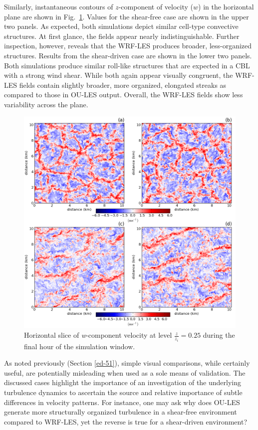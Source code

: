 Similarly, instantaneous contours of $z$-component of velocity ($w$) in the horizontal plane are shown in Fig.~\ref{figure503}. Values for the shear-free case are shown in the upper two panels. As expected, both simulations depict similar cell-type convective structures. At first glance, the fields appear nearly indistinguishable. Further inspection, however, reveals that the WRF-LES produces broader, less-organized structures. Results from the shear-driven case are shown in the lower two panels. Both simulations produce similar roll-like structures that are expected in a CBL with a strong wind shear. While both again appear visually congruent, the WRF-LES fields contain slightly broader, more organized, elongated streaks as compared to those in OU-LES output. Overall, the WRF-LES fields show less variability across the plane.


\begin{figure}[!ht]
\begin{center}
\includegraphics[width=\textwidth]{figures/chapter5/w_slice}
\end{center}
\caption{Horizontal slice of \textit{w}-component velocity at level $\frac{z}{z_i} = 0.25$ during the final hour of the simulation window.}
\label{figure503}
\end{figure}


As noted previously (Section \autoref{ed-51}), simple visual comparisons, while certainly useful, are potentially misleading when used as a sole means of validation. The discussed cases highlight the importance of an investigation of the underlying turbulence dynamics to ascertain the source and relative importance of subtle differences in velocity patterns. For instance, one may ask why does OU-LES generate more structurally organized turbulence in a shear-free environment compared to WRF-LES, yet the reverse is true for a shear-driven environment? 

